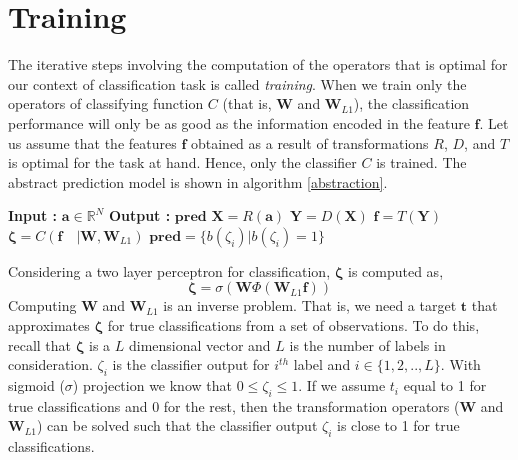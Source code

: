 \section{Training}
\label{training}
The iterative steps involving the computation of the operators that is optimal for our context of classification task is called \textit{training}. When we train only the operators of classifying function $C$ (that is, $\textbf{W}$ and $\textbf{W}_{L1}$), the classification performance will only be as good as the information encoded in the feature $\textbf{f}$. Let us assume that the features $\textbf{f}$ obtained as a result of transformations $R$, $D$, and $T$ is optimal for the task at hand. Hence, only the classifier $C$ is trained. The abstract prediction model is shown in algorithm \ref{abstraction}.
\begin{algorithm}
  \caption{$\textbf{pred}$ = $Model$($\textbf{a}$) }\label{abstraction}
  \begin{algorithmic}[1]
    \Statex \textbf{Input :} $\textbf{a} \in \mathbb{R}^{N}$
    \Statex \textbf{Output :} $\textbf{pred}$ 
    \State $\textbf{X} = R(\textbf{a})$ 
    \State $\textbf{Y} = D(\textbf{X})$ 
    \State $\textbf{f} = T(\textbf{Y})$ 
    \State $\bm{\zeta} = C(\textbf{f} \quad |\textbf{W},\textbf{W}_{L1})$ 
    \State $\textbf{pred} = \{ b(\zeta_{i}) | b(\zeta_{i}) = 1 \}$ 
  \end{algorithmic}
\end{algorithm}
\FloatBarrier
\noindent Considering a two layer perceptron for classification, $\bm{\zeta}$ is computed as,
\begin{equation}
\label{eq:mlp}
\bm{\zeta} = \sigma ( \textbf{W} \Phi (\textbf{W}_{L1}\textbf{f}))
\end{equation}
\noindent Computing $\textbf{W}$ and $\textbf{W}_{L1}$ is an inverse problem. That is, we need a target $\textbf{t}$ that approximates $\bm{\zeta}$ for true classifications from a set of observations. To do this, recall that $\bm{\zeta}$ is a $L$ dimensional vector and $L$ is the number of labels in consideration. $\zeta_{i}$ is the classifier output for $i^{th}$ label and $i \in \{1,2,..,L\}$. With sigmoid ($\sigma$) projection we know that $0 \leq \zeta_{i} \leq 1$. If we assume $t_{i}$ equal to 1 for true classifications and 0 for the rest, then the transformation operators ($\textbf{W}$ and $\textbf{W}_{L1}$) can be solved such that the classifier output $\zeta_{i}$ is close to 1 for true classifications.

